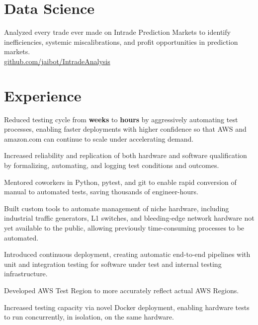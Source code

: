 \documentclass[]{resume}
\begin{document}
\begin{minipage}[t]{0.66\textwidth} 



\section {Data Science}
Analyzed every trade ever made on Intrade Prediction Markets to identify
inefficiencies, systemic miscalibrations, and profit opportunities in prediction markets.\\
\href{http://github.com/jaibot/IntradeAnalysis}{github.com/jaibot/IntradeAnalysis }

\section{Experience}
\vspace{\topsep} %
\begin{tightemize}
\item Reduced testing cycle from \textbf{weeks} to \textbf{hours} by aggressively automating test processes, enabling faster deployments with higher confidence so that AWS and amazon.com can continue to scale under accelerating demand.
\item Increased reliability and replication of both hardware and software qualification by formalizing, automating, and logging test conditions and outcomes.
\item Mentored coworkers in Python, pytest, and git to enable rapid conversion of manual to automated tests, saving thousands of engineer-hours.
\item Built custom tools to automate management of niche hardware, including industrial traffic generators, L1 switches, and bleeding-edge network hardware not yet available to the public, allowing previously time-consuming processes to be automated.
\item Introduced continuous deployment, creating automatic end-to-end pipelines with unit and integration testing for software under test and internal testing infrastructure.
\item Developed AWS Test Region to more accurately reflect actual AWS Regions.
\item Increased testing capacity via novel Docker deployment, enabling hardware tests to run concurrently, in isolation, on the same hardware.
\end{tightemize}
\sectionsep


\end{minipage}
\end{document}
